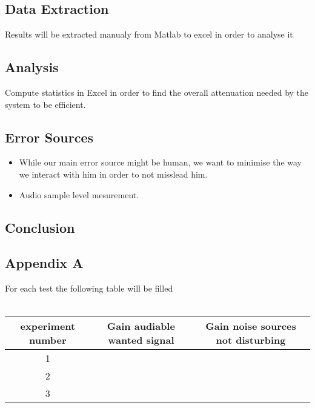 \vspace{1cm}
\subsection{Data Extraction}

Results will be extracted manualy from Matlab to excel in order to analyse it

\vspace{1cm}
\subsection{Analysis}

Compute statistics in Excel in order to find the overall attenuation needed by the system to be efficient.
\vspace{1cm}

\subsection{Error Sources}
\begin{itemize}
\item While our main error source might be human, we want to minimise the way we interact with him in order to not misslead him.
\item Audio sample level mesurement.
\end{itemize}

\vspace{1cm}
\subsection{Conclusion}

\subsection*{Appendix A}
For each test the following table will be filled \\\\
\begin{tabular}{c  c  c} \toprule
experiment number & Gain audiable wanted signal & Gain noise sources not disturbing  \\ \toprule
1 &  & \\
2 &  & \\
3 &  & \\ \bottomrule
\end{tabular}

